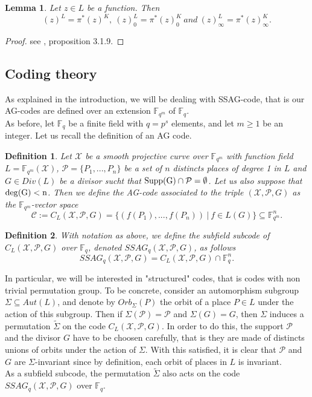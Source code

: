 \documentclass[10pt]{article}
\newtheorem{def1}{Definition}[]
\newtheorem{lem1}{Lemma}[]
\newcommand{\s}{\vspace{0.3cm}}
\newcommand{\fqm}{\mathbb{F}_{q^m}}
\newcommand{\fq}{\mathbb{F}_q}
\newcommand{\su}{\subseteq}
\newcommand{\X}{\mathcal{X}}
\newcommand{\PR}{\mathcal{P}}
\begin{document}
\s

\begin{lem1}
Let $z \in L$ be a function. Then 
\[(z)^L = \pi^*(z)^K, \ (z)^L_0 = \pi^*(z)_0^K \ and \ (z)^L_{\infty} = \pi^*(z)^K_{\infty}.\]
\end{lem1} 

\s

\begin{proof}
see \cite{Sti}, proposition 3.1.9.
\end{proof}

\s

\subsection{Coding theory}

\s

As explained in the introduction, we will be dealing with SSAG-code, that is our AG-codes are defined over an extension $\fqm$ of $\fq$. \\
As before, let $\fq$ be a finite field with $q=p^s$ elements, and let $m \geq 1$ be an integer. Let us recall the definition of an AG code.

\s

\begin{def1}
Let $\X$ be a smooth projective curve over $\fqm$ with function field $L = \fqm(\X)$, $\PR = \{P_1,...,P_n\}$ be a set of $n$ distincts places of degree 1 in $L$  and $G \in Div(L)$ be a divisor sucht that $\rm{Supp}(G) \cap \PR = \emptyset$. Let us also suppose that $\rm{deg}(G)<n$. Then we define the AG-code associated to the triple $(\X,\PR,G)$ as the $\fqm$-vector space
\[\mathcal{C} := C_L(\X,\PR,G) = \{ (f(P_1),...,f(P_n)) \ | \ f \in L(G)\} \su \fqm^n.\]
\end{def1}

\s

\begin{def1}
With notation as above, we define the subfield subcode of $C_L(\X,\PR,G)$ over $\fq$, denoted $SSAG_q(\X,\PR,G)$, as follows
\[ SSAG_q(\X,\PR,G) = C_L(\X,\PR,G) \cap \fq^n.\]
\end{def1}

\s

In particular, we will be interested in "structured" codes, that is codes with non trivial permutation group. To be concrete, consider an automorphism subgroup $\Sigma \su Aut(L)$, and denote by $Orb_{\Sigma}(P)$ the orbit of a place $P \in L$ under the action of this subgroup. Then if $\Sigma(\PR) = \PR$ and $\Sigma(G)=G$, then $\Sigma$ induces a permutation $\tilde{\Sigma}$ on the code $C_L(\X,\PR,G)$. In order to do this, the support $\PR$ and the divisor $G$ have to be choosen carefully, that is they are made of distincts unions of orbits under the action of $\Sigma$. With this satisfied, it is clear that $\PR$ and $G$ are $\Sigma$-invariant since by definition, each orbit of places in $L$ is invariant. \\
As a subfield subcode, the permutation $\tilde{\Sigma}$ also acts on the code $SSAG_q(\X,\PR,G)$ over $\fq$.
\end{document}
